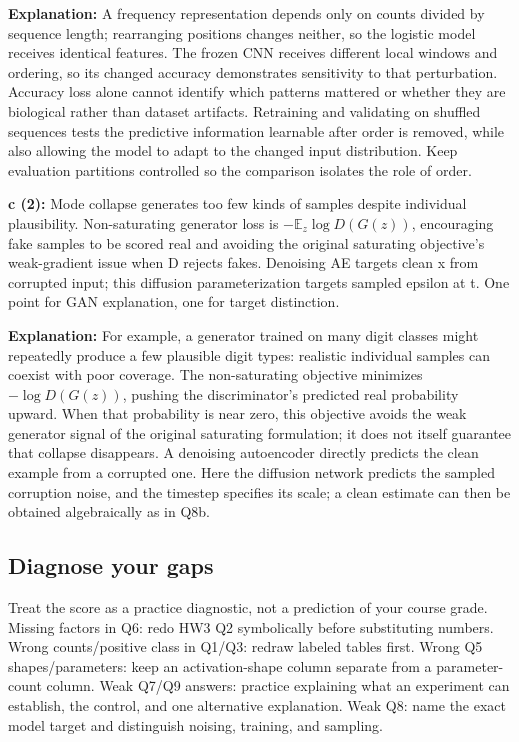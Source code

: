 \documentclass[11pt]{article}
\begin{document}
\textbf{Explanation:} A frequency representation depends only on counts divided by sequence length; rearranging positions changes neither, so the logistic model receives identical features. The frozen CNN receives different local windows and ordering, so its changed accuracy demonstrates sensitivity to that perturbation. Accuracy loss alone cannot identify which patterns mattered or whether they are biological rather than dataset artifacts. Retraining and validating on shuffled sequences tests the predictive information learnable after order is removed, while also allowing the model to adapt to the changed input distribution. Keep evaluation partitions controlled so the comparison isolates the role of order.

\textbf{c (2):} Mode collapse generates too few kinds of samples despite individual plausibility. Non-saturating generator loss is $-\mathbb E_z\log D(G(z))$, encouraging fake samples to be scored real and avoiding the original saturating objective's weak-gradient issue when D rejects fakes. Denoising AE targets clean x from corrupted input; this diffusion parameterization targets sampled epsilon at t. One point for GAN explanation, one for target distinction.

\textbf{Explanation:} For example, a generator trained on many digit classes might repeatedly produce a few plausible digit types: realistic individual samples can coexist with poor coverage. The non-saturating objective minimizes $-\log D(G(z))$, pushing the discriminator's predicted real probability upward. When that probability is near zero, this objective avoids the weak generator signal of the original saturating formulation; it does not itself guarantee that collapse disappears. A denoising autoencoder directly predicts the clean example from a corrupted one. Here the diffusion network predicts the sampled corruption noise, and the timestep specifies its scale; a clean estimate can then be obtained algebraically as in Q8b.


\subsection*{Diagnose your gaps}

Treat the score as a practice diagnostic, not a prediction of your course grade. Missing factors in Q6: redo HW3 Q2 symbolically before substituting numbers. Wrong counts/\allowbreak{}positive class in Q1/\allowbreak{}Q3: redraw labeled tables first. Wrong Q5 shapes/\allowbreak{}parameters: keep an activation-shape column separate from a parameter-count column. Weak Q7/\allowbreak{}Q9 answers: practice explaining what an experiment can establish, the control, and one alternative explanation. Weak Q8: name the exact model target and distinguish noising, training, and sampling.
\end{document}
